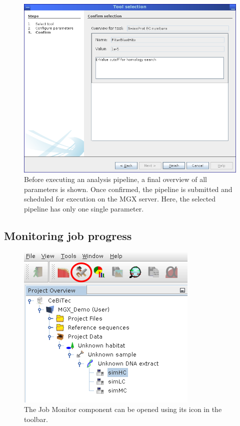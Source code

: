 \begin{figure}[H]
\centering
\includegraphics[width=.8\textwidth]{img/mgx/analysiswiz3}
\caption[Parameter overview]{Before executing an analysis pipeline, a final overview of all parameters is shown. Once
confirmed, the pipeline is submitted and scheduled for execution on the MGX server. Here, the selected pipeline has
only one single parameter.}
\label{anawiz3}
\end{figure}

\subsection{Monitoring job progress}

\begin{figure}[H]
\centering
\includegraphics[width=.6\textwidth]{img/mgx/JobMonOpen}
\caption[Job monitor]{The Job Monitor component can be opened using its icon in the toolbar.}
\label{jobmon1}
\end{figure}

